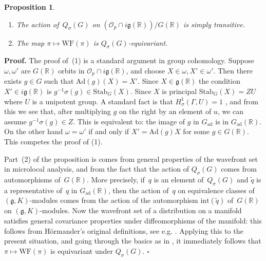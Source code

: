 \documentclass[10pt,leqno]{article}
\newtheorem{proposition}[equation]{Proposition}
\newcommand{\qed}{\hfill $\square$ \medskip}
\newenvironment{proof}[1][Proof]{\noindent\textbf{#1.} }{\qed}
\newcommand{\Ad}{\mathrm{Ad}}
\newcommand{\Gad}{G_\mathrm{ad}}
\newcommand{\Stab}{\mathrm{Stab}}
\renewcommand{\O}{\mathcal O}
\newcommand{\R}{\mathbb R}
\newcommand{\g}{\mathfrak g}
\newcommand\inv{^{-1}}
\newcommand{\WF}{\mathrm{WF}}
\newcommand{\Op}{\O_p}
\begin{document}
\begin{proposition}\label{prop:action_on_real_orbits}
\begin{enumerate} 
\item The action of~$Q_{\sigma}(G)$ on $(\Op\cap i\g(\R))/G(\R)$ is simply transitive.
\item The map $\pi \mapsto \WF(\pi)$ is $Q_{\sigma}(G)$-equivariant.
\end{enumerate}
\end{proposition}

\begin{proof}
The proof of~(1) is a standard argument in group cohomology. Suppose $\omega,\omega'$ are $G(\R)$ orbits in $\Op\cap i\g(\R)$,
and choose $X\in \omega,X'\in\omega'$. Then there exists $g\in G$ such that $\Ad(g)(X)=X'$. Since $X\in \g(\R)$ the condition $X'\in i\g(\R)$ 
is $g\inv \sigma(g)\in \Stab_G(X)$.  Since $X$ is principal $\Stab_G(X)=ZU$ where $U$ is a unipotent group. 
A standard fact is that $H^1_\sigma(\Gamma,U)=1$ \cite[Chap.~III, Proposition~6]{Serre_Galois}, and from this we see that, after multiplying $g$ on the right by an element of $u$, we can assume $g\inv \sigma(g)\in Z$. This is equivalent to: the image of $g$ in $\Gad$ is in $\Gad(\R)$. On the other hand $\omega=\omega'$ 
if and only if $X'=\Ad(g)X$ for some $g\in G(\R)$. This competes the proof of (1).

Part~(2) of the proposition is comes from general properties of the wavefront set in microlocal analysis, and from the fact that the action of $Q_{\sigma}(G)$ comes from automorphisms of~$G(\R)$. More precisely, if~$q$ is an element of~$Q_{\sigma}(G)$ and $\tilde{q}$ is a representative of~$q$ in $\Gad(\R)$, then the action of~$q$ on equivalence classes of $(\g, K)$-modules comes from the action of the automorphism $\mathrm{int}(\tilde{q})$ of~$G(\R)$ on $(\g, K)$-modules. Now the wavefront set of a distribution on a manifold satisfies general covariance properties under diffeomorphisms of the manifold: this follows from Hörmander's original definitions, see e.g. \cite[Section 2, p.~800]{HarrisHeOlafsson}. Applying this to the present situation, and going through the basics as in   \cite[Section~2]{HarrisHeOlafsson}, it immediately follows that $\pi \mapsto \WF(\pi)$ is equivariant under $Q_{\sigma}(G)$.
\end{proof}
\end{document}
